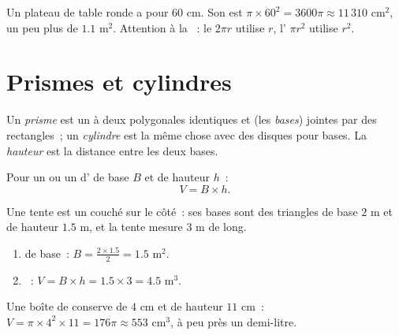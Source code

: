\begin{example}\label{ex:g7:areas:disk}
Un plateau de table ronde a pour  $60$ cm. Son  est
$\pi \times 60^2 = 3600\pi \approx 11\,310$ cm$^2$, un peu plus de
$1.1$ m$^2$. Attention à la ~: le \emph{}
$2\pi r$ utilise $r$, l'\emph{} $\pi r^2$ utilise $r^2$.
\end{example}

\section{Prismes et cylindres}

\begin{definition}\label{def:g7:areas:prism}
Un \emph{prisme} est un  à deux  polygonales
identiques et  (les \emph{bases}) jointes par des
rectangles~; un \emph{cylindre} est la même chose avec
des disques pour bases. La \emph{hauteur} est la distance entre les
deux bases.
\end{definition}

\begin{theorem}[Volumes]\label{thm:g7:areas:volume}
Pour un  ou un  d' de base $B$ et de hauteur $h$~:
\[
V = B \times h .
\]
\end{theorem}
\admitted

\begin{example}\label{ex:g7:areas:volume}
Une tente est un  couché sur le côté~: ses bases sont des
triangles de base $2$ m et de hauteur $1.5$ m, et la tente mesure
$3$ m de long.
\begin{enumerate}
  \item {} de base~: $B = \frac{2 \times 1.5}{2} = 1.5$ m$^2$.
  \item {}~: $V = B \times h = 1.5 \times 3 = 4.5$ m$^3$.
\end{enumerate}
Une boîte de conserve de  $4$ cm et de hauteur $11$ cm~:
$V = \pi \times 4^2 \times 11 = 176\pi \approx 553$ cm$^3$, à peu
près un demi-litre.
\end{example}

